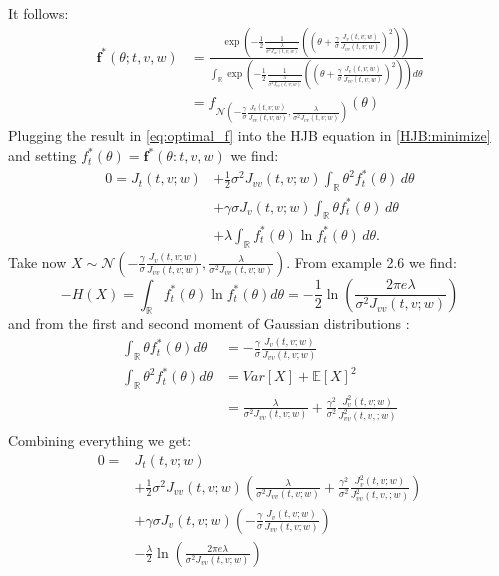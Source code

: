 \documentclass[oneside, a4paper, onecolumn, 11pt]{article}
\begin{document}
It follows: 
\begin{align}
\boldsymbol{f}^*(\theta;t,v,w) &= \frac{\exp\left(-\frac{1}{2} \frac{1}{\frac{\lambda}{\sigma^2 J_{vv}(t,v;w)}}
    \left( \left( \theta + \frac{\gamma}{\sigma}\frac{ J_v(t,v; w)}{J_{vv}(t,v;w)} \right)^2 \right) \right)} {\int_{\mathbb{R}} \exp \left(-\frac{1}{2} \frac{1}{\frac{\lambda}{\sigma^2 J_{vv}(t,v;w)}}
    \left( \left( \theta + \frac{\gamma}{\sigma}\frac{ J_v(t,v; w)}{J_{vv}(t,v;w)} \right)^2 \right)\right) d\theta }  \\ 
    &= f_{\mathcal{N}\left(- \frac{\gamma}{\sigma}\frac{ J_v(t,v; w)}{J_{vv}(t,v;w)}, \frac{\lambda}{\sigma^2 J_{vv}(t,v;w)} \right)} (\theta)
    \label{eq:optimal_f}
\end{align}
Plugging the result in \eqref{eq:optimal_f} into the HJB equation in \eqref{HJB:minimize} and setting $f_t^*(\theta) = \boldsymbol{f}^*(\theta: t, v, w)$ we find: 
\begin{align*}
    0 = J_t(t,v;w) &+ \frac{1}{2} \sigma^2 J_{vv}(t,v;w) \int_{\mathbb{R}} \theta^2 f_t^*(\theta) \, d\theta \\
    & + \gamma \sigma J_v(t,v;w) \int_{\mathbb{R}} \theta f_t^*(\theta) \, d\theta \\
    & + \lambda \int_{\mathbb{R}} f_t^*(\theta) \ln f_t^*(\theta) \, d\theta .
\end{align*}
 Take now $X \sim \mathcal{N}\left(- \frac{\gamma}{\sigma}\frac{ J_v(t,v; w)}{J_{vv}(t,v;w)}, \frac{\lambda}{\sigma^2 J_{vv}(t,v;w)} \right) $. From example 2.6 we find: 
$$ - H(X) = \int_{\mathbb{R}} f_t^*(\theta) \ln{f_t^*(\theta)} d\theta =  - \frac{1}{2}\ln \left(\frac{2\pi e \lambda}{\sigma^2 J_{vv}(t,v;w) }\right)$$ 
and from the first and second moment of Gaussian distributions : 
\begin{align*}
\int_{\mathbb{R}} \theta f_t^*(\theta) d\theta &= -\frac{\gamma}{\sigma}\frac{ J_v(t,v; w)}{J_{vv}(t,v;w)}\\
\int_{\mathbb{R}} \theta^2 f_t^*(\theta) d\theta &= Var\left[X\right] + \mathbb{E}\left[X\right]^2 \\
&= \frac{\lambda}{\sigma^2 J_{vv}(t,v;w)} + \frac{\gamma^2}{\sigma^2}\frac{J_v^2(t,v;w)}{J_{vv}^2(t,v,;w)}\\ 
\end{align*}
Combining everything we get: 
\begin{align*}
 0 = &J_t(t,v;w) \\
     & + \frac{1}{2} \sigma^2 J_{vv}(t,v;w) \left(\frac{\lambda}{\sigma^2 J_{vv}(t,v;w)} + \frac{\gamma^2}{\sigma^2}\frac{J_v^2(t,v;w)}{J_{vv}^2(t,v,;w)} \right) \\ 
     & + \gamma \sigma J_v(t,v;w) \left( - \frac{\gamma}{\sigma}\frac{ J_v(t,v; w)}{J_{vv}(t,v;w)}  \right) \\ 
     & - \frac{\lambda}{2} \ln \left(\frac{2\pi e \lambda}{\sigma^2 J_{vv}(t,v;w) }\right) 
\end{align*}
\end{document}
